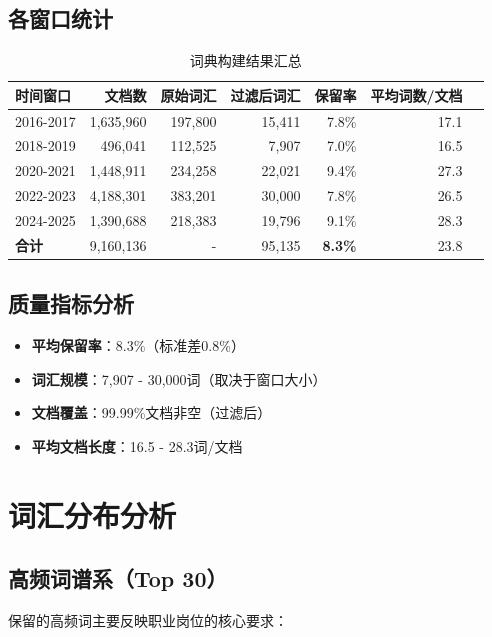 \documentclass[11pt,a4paper]{article}
\begin{document}
\subsection{各窗口统计}

\begin{table}[h]
\centering
\begin{tabular}{lrrrrrr}
\toprule
\textbf{时间窗口} & \textbf{文档数} & \textbf{原始词汇} & \textbf{过滤后词汇} & \textbf{保留率} & \textbf{平均词数/文档} \\
\midrule
2016-2017 & 1,635,960 & 197,800 & 15,411 & 7.8\% & 17.1 \\
2018-2019 & 496,041 & 112,525 & 7,907 & 7.0\% & 16.5 \\
2020-2021 & 1,448,911 & 234,258 & 22,021 & 9.4\% & 27.3 \\
2022-2023 & 4,188,301 & 383,201 & 30,000 & 7.8\% & 26.5 \\
2024-2025 & 1,390,688 & 218,383 & 19,796 & 9.1\% & 28.3 \\
\midrule
\textbf{合计} & 9,160,136 & - & 95,135 & \textbf{8.3\%} & 23.8 \\
\bottomrule
\end{tabular}
\caption{词典构建结果汇总}
\end{table}

\subsection{质量指标分析}

\begin{itemize}
    \item \textbf{平均保留率}：8.3\%（标准差0.8\%）
    \item \textbf{词汇规模}：7,907 - 30,000词（取决于窗口大小）
    \item \textbf{文档覆盖}：99.99\%文档非空（过滤后）
    \item \textbf{平均文档长度}：16.5 - 28.3词/文档
\end{itemize}

\section{词汇分布分析}

\subsection{高频词谱系（Top 30）}

保留的高频词主要反映职业岗位的核心要求：
\end{document}
